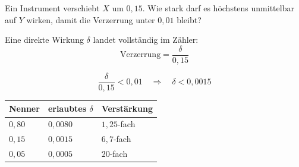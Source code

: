 \begin{aufgabe}
Ein Instrument verschiebt $X$ um $0{,}15$. Wie stark darf es höchstens unmittelbar auf $Y$ wirken, damit die Verzerrung unter $0{,}01$ bleibt?

\loesung
{}
Eine direkte Wirkung $\delta$ landet vollständig im Zähler:
\[ \text{Verzerrung} = \frac{\delta}{0{,}15} \]

\[ \frac{\delta}{0{,}15} < 0{,}01 \quad\Longrightarrow\quad \delta < 0{,}0015 \]

\begin{center}
{\small
\renewcommand{\arraystretch}{1.48}
\begin{tabular}{@{}P{2.2cm}P{2.6cm}P{2.4cm}@{}}
\toprule
\textbf{Nenner} & \textbf{erlaubtes $\delta$} & \textbf{Verstärkung}\\
\midrule
$0{,}80$ & $0{,}0080$ & $1{,}25$-fach\\
$0{,}15$ & $0{,}0015$ & $6{,}7$-fach\\
$0{,}05$ & $0{,}0005$ & $20$-fach\\
\bottomrule
\end{tabular}}
\end{center}

\begin{center}
\begin{minipage}{0.88\textwidth}
\end{minipage}
\end{center}
\end{aufgabe}

